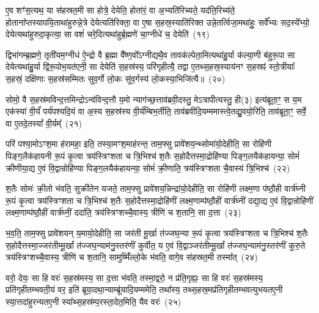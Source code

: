ए॒व शꣳ॑स॒त्यथ॒ या स॑हस्रत॒मी सा होत्रे॒ देयेति॒ होता॑रं॒ वा अ॒भ्यति॑रिच्यते॒ यद॑ति॒रिच्य॑ते॒ होताना᳚प्तस्यापयि॒ता\-था॑हुरुन्ने॒त्रे देयेत्यति॑रिक्ता॒ वा ए॒षा स॒हस्र॒स्याति॑रिक्त उन्ने॒तर्त्विजा॒मथा॑हुः॒ सर्वे᳚भ्यः सद॒स्ये᳚भ्यो॒ देयेत्यथा॑हुरुदा॒कृत्या॒ सा वशं॑ चरे॒दित्यथा॑हुर्ब्र॒ह्मणे॑ चा॒ग्नीधे॑ च॒ देयेति॑~(१९)

द्विभा॑गम्ब्र॒ह्मणे॒ तृती॑यम॒ग्नीध॑ ऐ॒न्द्रो वै ब्र॒ह्मा वै᳚ष्ण॒वो᳚\-ऽग्नीद्यथै॒व तावक॑ल्पेता॒मित्यथा॑हु॒र्या क॑ल्या॒णी ब॑हुरू॒पा सा देयेत्यथा॑हु॒र्या द्वि॑रू॒पोभ॒यत॑एनी॒ सा देयेति॑ स॒हस्र॑स्य॒ परि॑गृहीत्यै॒ तद्वा ए॒तथ्स॒हस्र॒स्याय॑नꣳ स॒हस्रꣴ॑ स्तो॒त्रीयाः᳚ स॒हस्रं॒ दक्षि॑णाः स॒हस्र॑सम्मितः सुव॒र्गो लो॒कः सु॑व॒र्गस्य॑ लो॒कस्या॒भिजि॑त्यै॥~(२०)

{\anuvakamend[{अ॒ब्र॒वी॒च्च॒ तद॒न्तरि॑क्षन्ददात्यच्छावा॒कश्च॒ देयेति॑ स॒प्तच॑त्वारिꣳशच्च}]}%

सोमो॒ वै स॒हस्र॑मविन्द॒त्तमिन्द्रो\-ऽन्व॑विन्द॒त्तौ य॒मो न्याग॑च्छ॒त्ताव॑ब्रवी॒दस्तु॒ मे\-ऽत्रापीत्यस्तु॒ ही(३) इत्य॑ब्रूता॒ꣳ॒ स य॒म एक॑स्यां वी॒र्यं॑ पर्य॑पश्यदि॒यं वा अ॒स्य स॒हस्र॑स्य वी॒र्य॑म्बिभ॒र्तीति॒ ताव॑ब्रवीदि॒यम्ममास्त्वे॒तद्यु॒वयो॒रिति॒ ताव॑ब्रूता॒ꣳ॒ सर्वे॒ वा ए॒तदे॒तस्यां᳚ वी॒र्यम्᳚~(२१)

परि॑ पश्या॒मो\-ऽꣳश॒मा ह॑रामहा॒ इति॒ तस्या॒मꣳश॒माह॑रन्त॒ ताम॒फ्सु प्रावे॑शय॒न्थ्सोमा॑यो॒देहीति॒ सा रोहि॑णी पिङ्ग॒लैक॑हायनी रू॒पं कृ॒त्वा त्रय॑स्त्रिꣳशता च त्रि॒भिश्च॑ श॒तैः स॒होदैत्तस्मा॒द्रोहि॑ण्या पिङ्ग॒लयैक॑हायन्या॒ सोमं॑ क्रीणीया॒द्य ए॒वं वि॒द्वान्रोहि॑ण्या पिङ्ग॒लयैक॑हायन्या॒ सोमं॑ क्री॒णाति॒ त्रय॑स्त्रिꣳशता चै॒वास्य॑ त्रि॒भिश्च॑~(२२)

श॒तैः सोमः॑ क्री॒तो भ॑वति॒ सुक्री॑तेन यजते॒ ताम॒फ्सु प्रावे॑शय॒न्निन्द्रा॑यो॒देहीति॒ सा रोहि॑णी लक्ष्म॒णा प॑ष्ठौ॒ही वार्त्र॑घ्नी रू॒पं कृ॒त्वा त्रय॑स्त्रिꣳशता च त्रि॒भिश्च॑ श॒तैः स॒होदैत्तस्मा॒द्रोहि॑णीं लक्ष्म॒णाम्प॑ष्ठौ॒हीं वार्त्र॑घ्नीं दद्या॒द्य ए॒वं वि॒द्वान्रोहि॑णीं लक्ष्म॒णाम्प॑ष्ठौ॒हीं वार्त्र॑घ्नीं॒ ददा॑ति॒ त्रय॑स्त्रिꣳशच्चै॒वास्य॒ त्रीणि॑ च श॒तानि॒ सा द॒त्ता~(२३)

भ॒व॒ति॒ ताम॒फ्सु प्रावे॑शयन् य॒मायो॒देहीति॒ सा जर॑ती मू॒र्खा त॑ज्जघ॒न्या रू॒पं कृ॒त्वा त्रय॑स्त्रिꣳशता च त्रि॒भिश्च॑ श॒तैः स॒होदैत्तस्मा॒ज्जर॑तीम्मू॒र्खां त॑ज्जघ॒न्याम॑नु॒स्तर॑णीं कुर्वीत॒ य ए॒वं वि॒द्वाञ्जर॑तीम्मू॒र्खां त॑ज्जघ॒न्याम॑नु॒स्तर॑णीं कुरु॒ते त्रय॑स्त्रिꣳशच्चै॒वास्य॒ त्रीणि॑ च श॒तानि॒ सामुष्मिँ॑ल्लो॒के भ॑वति॒ वागे॒व स॑हस्रत॒मी तस्मा᳚त्~(२४)

वरो॒ देयः॒ सा हि वरः॑ स॒हस्र॑मस्य॒ सा द॒त्ता भ॑वति॒ तस्मा॒द्वरो॒ न प्र॑ति॒गृह्यः॒ सा हि वरः॑ स॒हस्र॑मस्य॒ प्रति॑गृहीत\-म्भवती॒यं वर॒ इति॑ ब्रूया॒दथा॒न्याम्ब्रू॑यादि॒यम्ममेति॒ तथा᳚स्य॒ तथ्स॒हस्र॒मप्र॑तिगृहीतम्भवत्युभयतए॒नी स्या॒त्तदा॑हुरन्यत\-ए॒नी स्या᳚थ्स॒हस्र॑म्प॒रस्ता॒देत॒मिति॒ यैव वरः॑~(२५)

